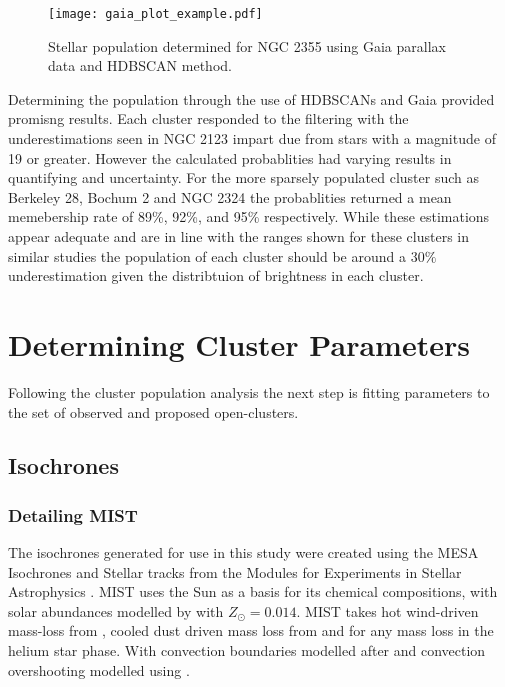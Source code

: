 \begin{figure}
  \centering
  \texttt{[image: gaia\_plot\_example.pdf]}
  \caption{Stellar population determined for NGC 2355 using Gaia parallax data and HDBSCAN method.}
  \label{fig:gaiaexample}
\end{figure}

Determining the population through the use of HDBSCANs and Gaia provided promisng results. Each cluster responded to the filtering with the underestimations seen in NGC 2123 impart due from stars with a magnitude of 19 or greater. However the calculated probablities had varying results in quantifying and uncertainty. For the more sparsely populated cluster such as Berkeley 28, Bochum 2 and NGC 2324 the probablities returned a mean memebership rate of 89\%, 92\%, and 95\% respectively. While these estimations appear adequate and are in line with the ranges shown for these clusters in similar studies \citep{2019A&A...623A.108B, 1988Mohan, 1998Frandsen, 1991Kalunzy} the population of each cluster should be around a $30\%$ underestimation given the distribtuion of brightness in each cluster. 

\section{Determining Cluster Parameters}

Following the cluster population analysis the next step is fitting parameters to the set of observed and proposed open-clusters. 

\subsection{Isochrones}
\subsubsection{Detailing MIST}
The isochrones generated for use in this study were created using the MESA Isochrones and Stellar tracks \citep[MIST;][]{2016ApJ...823..102C} from the Modules for Experiments in Stellar Astrophysics \citep[MESA;][]{2018ApJS..234...34P}. MIST uses the Sun as a basis for its chemical compositions, with solar abundances modelled by \cite{doi:10.1146/annurev.astro.46.060407.145222} with $Z_\odot = 0.014$. MIST  takes hot wind-driven mass-loss from \cite{2001A&A...369..574V}, cooled dust driven mass loss from \cite{1988A&AS...72..259D} and \cite{2000A&A...360..227N} for any mass loss in the helium star phase. With convection boundaries modelled after \cite{1947ApJ...105..305L} and convection overshooting modelled using \cite{2000A&A...360..952H}. \\

